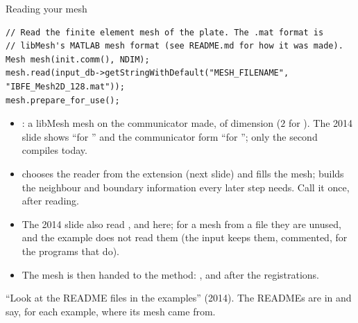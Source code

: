 \documentclass[aspectratio=169,11pt]{beamer}
\begin{document}
\begin{frame}[fragile]{Reading your mesh}
\label{fr:readmesh}
\footnotesize
\begin{lstlisting}[style=cpptiny]
// Read the finite element mesh of the plate. The .mat format is
// libMesh's MATLAB mesh format (see README.md for how it was made).
Mesh mesh(init.comm(), NDIM);
mesh.read(input_db->getStringWithDefault("MESH_FILENAME", "IBFE_Mesh2D_128.mat"));
mesh.prepare_for_use();
\end{lstlisting}
\begin{itemize}
  \item {}: a libMesh mesh on the communicator  made, of dimension  ($2$ for ). The 2014 slide shows  ``for '' and the communicator form ``for ''; only the second compiles today.
  \item {} chooses the reader from the extension (next slide) and fills the mesh;  builds the neighbour and boundary information every later step needs. Call it once, after reading.
  \item The 2014 slide also read ,  and  here; for a mesh from a file they are unused, and the example does not read them (the input keeps them, commented, for the programs that do).
  \item The mesh is then handed to the method: , and  after the registrations.
\end{itemize}
\begin{punchbox}
\footnotesize ``Look at the README files in the examples'' (2014). The READMEs are in  and say, for each example, where its mesh came from.
\end{punchbox}
\end{frame}
\end{document}
